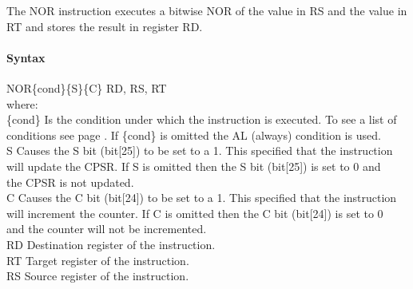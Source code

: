 \documentclass[12pt]{article}
\begin{document}
    \noindent
    The NOR instruction executes a bitwise NOR of the value in RS and the value in RT and stores the result in register RD. 
    
    \paragraph{Syntax}
    \begin{flushleft}
    NOR\{cond\}\{S\}\{C\} RD, RS, RT\\
    \vspace{1em}        %
    where:\\
    \vspace{1em}
    \{cond\}    \hspace{2em} Is the condition under which the instruction is executed. To see a list of\\
                \hspace{5.4em} conditions see page . If \{cond\} is omitted the AL (always) condition is used.\\
    \vspace{1em}    
    S       \hspace{4.5em} Causes the S bit (bit[25]) to be set to a 1. This specified that the instruction\\
            \hspace{5.4em} will update the CPSR. If S is omitted then the S bit (bit[25]) is set to 0 and\\
            \hspace{5.4em} the CPSR is not updated.\\
    \vspace{1em}    
    C       \hspace{4.5em} Causes the C bit (bit[24]) to be set to a 1. This specified that the instruction\\
            \hspace{5.4em} will increment the counter. If C is omitted then the C bit (bit[24]) is set to 0\\
            \hspace{5.4em} and the counter will not be incremented.\\
    \vspace{1em}
    RD  \hspace{3.6em} Destination register of the instruction.\\
    \vspace{1em}
    RT  \hspace{3.7em} Target register of the instruction.\\
    \vspace{1em}
    RS  \hspace{3.85em} Source register of the instruction.\\
    \end{flushleft}
    
\end{document}
